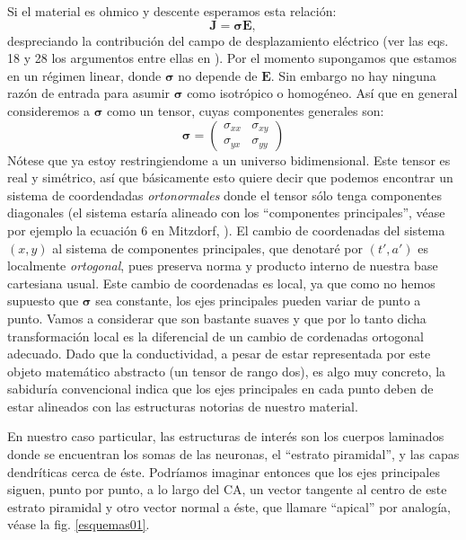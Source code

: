 \documentclass{article}
\newcommand{\Jd}{\mathbf{J}}
\newcommand{\EF}{\mathbf{E}}
\newcommand{\cond}{\boldsymbol{\sigma}}
\begin{document}
Si el material es ohmico y descente esperamos esta relación:
\begin{equation}
\Jd=\cond \EF,
\end{equation}
despreciando la contribución del campo de desplazamiento eléctrico (ver
las eqs. 18 y 28 los argumentos entre ellas en \cite{Bedard11}).
Por el momento supongamos que estamos en un régimen linear, donde
$\cond$ no depende de $\EF$. Sin embargo no hay ninguna razón
de entrada para asumir $\cond$ como isotrópico o homogéneo. Así que en
general consideremos a $\cond$ como un tensor, cuyas componentes generales
son:
\begin{equation}
\cond=\begin{pmatrix}
\sigma_{xx} & \sigma_{xy} \\
\sigma_{yx} & \sigma_{yy}
\end{pmatrix}
\end{equation}
Nótese que ya estoy restringiendome a un universo bidimensional.
Este tensor es real y simétrico, así que básicamente esto quiere decir
que podemos encontrar un sistema de coordendadas \emph{ortonormales}
donde el tensor sólo tenga componentes diagonales (el sistema estaría
alineado con los ``componentes principales'', véase por ejemplo la
ecuación 6 en Mitzdorf,
\cite{Mitzdorf85}). El cambio de coordenadas del sistema $(x,y)$ al
sistema de componentes principales, que denotaré por $(t',a')$ es localmente
\emph{ortogonal}, pues preserva norma y producto interno de nuestra
base cartesiana usual. Este cambio de coordenadas es local, ya que como
no hemos supuesto que $\cond$ sea constante, los ejes principales
pueden variar de punto a punto. Vamos a considerar que son 
bastante suaves y que por lo tanto dicha transformación local es la
diferencial de un cambio de cordenadas ortogonal adecuado.
Dado que la conductividad, a pesar de estar representada por este
objeto matemático abstracto (un tensor de rango dos), es algo muy concreto,
la sabiduría convencional indica que los ejes principales en cada punto
deben de estar alineados con las estructuras notorias de nuestro material.

En nuestro caso particular, las estructuras de interés son los cuerpos laminados
donde se encuentran los somas de las neuronas, el ``estrato piramidal'',
y las capas dendríticas cerca de éste. Podríamos imaginar entonces
que los ejes principales siguen, punto por punto, a lo largo del
CA, un vector tangente al centro de este estrato piramidal y otro vector
normal a éste, que llamare ``apical'' por analogía, véase la fig. 
\ref{esquemas01}.
\end{document}
